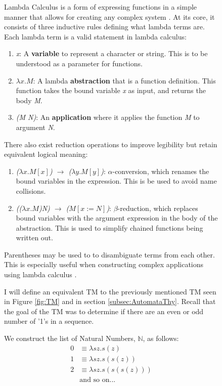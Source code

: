\begin{figure}[htb]
Lambda Calculus is a form of expressing functions in a simple manner that allows for creating any complex system \cite{LambdaCalcRG}.
At its core, it consists of three inductive rules defining what lambda terms are.
Each lambda term is a valid statement in lambda calculus:
\begin{enumerate}
    \item \textit{x}: A \textbf{variable} to represent a character or string.
    This is to be understood as a parameter for functions.
    \item \textit{$\lambda x.M$}: A lambda \textbf{abstraction} that is a function definition.
    This function takes the bound variable \textit{x} as input, and returns the body \textit{M}.
    \item \textit{(M N)}: An \textbf{application} where it applies the function \textit{M} to argument \textit{N}.
\end{enumerate}

There also exist reduction operations to improve legibility but retain equivalent logical meaning:
\begin{enumerate}
    \item \textit{($\lambda x.M[x]$) $\rightarrow$ ($\lambda y.M[y]$)}: $\alpha$-conversion, which renames the bound variables in the expression.
    This is be used to avoid name collisions.
    \item \textit{(($\lambda x.M$)\textit{N}) $\rightarrow$ ($M[x:=N]$)}: $\beta$-reduction, which replaces bound variables with the argument expression in the body of the abstraction.
    This is used to simplify chained functions being written out.
\end{enumerate}

Parentheses may be used to to disambiguate terms from each other.
This is especially useful when constructing complex applications using lambda calculus \cite{LambdaCalcWiki}.

I will define an equivalent TM to the previously mentioned TM seen in Figure \ref{fig:TM} and in section \ref{subsec:AutomataThy}.
Recall that the goal of the TM was to determine if there are an even or odd number of '1's in a sequence.

We construct the list of Natural Numbers, $\mathbb{N}$, as follows:
\[
    \begin{aligned}
        0 &\equiv \lambda sz.s(z)\\
        1 &\equiv \lambda sz.s(s(z))\\
        2 &\equiv \lambda sz.s(s(s(z)))\\
        &\text{and so on...}\\
    \end{aligned}
\]


\end{figure}
